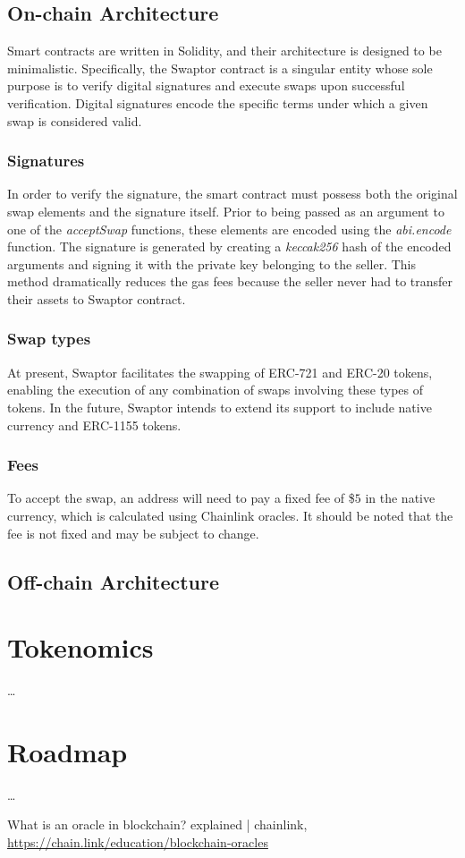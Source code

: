 \documentclass[12pt]{article}
\begin{document}
\subsection{On-chain Architecture}

\indent Smart contracts are written in Solidity, and their architecture is designed to be minimalistic.
Specifically, the Swaptor contract is a singular entity whose sole purpose is to verify digital signatures
and execute swaps upon successful verification. Digital signatures encode the specific terms under which a given swap is considered valid.

\subsubsection{Signatures}

In order to verify the signature, the smart contract must possess both the original swap elements
and the signature itself. Prior to being passed as an argument to one of the \textit{acceptSwap} functions,
these elements are encoded using the \textit{abi.encode} function. The signature is generated by creating a
\textit{keccak256} hash of the encoded arguments and signing it with the private key belonging to the seller.
This method dramatically reduces the gas fees because the seller never had to transfer their assets to Swaptor contract.

\subsubsection{Swap types}

At present, Swaptor facilitates the swapping of ERC-721 and ERC-20 tokens, enabling the execution of any combination of swaps involving these types of tokens.
In the future, Swaptor intends to extend its support to include native currency and ERC-1155 tokens.

\subsubsection{Fees}
To accept the swap, an address will need to pay a fixed fee of \$$5$ in the native currency, which is calculated using Chainlink oracles\cite{chainlink}. It should be noted that the fee is not fixed and may be subject to change.

\subsection{Off-chain Architecture}

\section{Tokenomics}
\dots

\section{Roadmap}
\dots

\begin{thebibliography}{9}
   What is an oracle in blockchain? explained | chainlink, \url{https://chain.link/education/blockchain-oracles}
\end{thebibliography}
\end{document}
